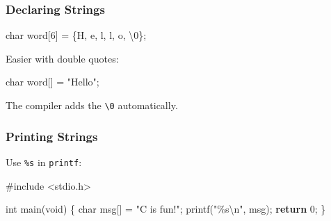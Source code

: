 \documentclass[
  letterpaper,
  DIV=11,
  numbers=noendperiod]{scrreprt}
\newenvironment{Shaded}{\begin{snugshade}}{\end{snugshade}}
\newcommand{\CharTok}[1]{\textcolor[rgb]{0.13,0.47,0.30}{#1}}
\newcommand{\ControlFlowTok}[1]{\textcolor[rgb]{0.00,0.23,0.31}{\textbf{#1}}}
\newcommand{\DataTypeTok}[1]{\textcolor[rgb]{0.68,0.00,0.00}{#1}}
\newcommand{\DecValTok}[1]{\textcolor[rgb]{0.68,0.00,0.00}{#1}}
\newcommand{\ImportTok}[1]{\textcolor[rgb]{0.00,0.46,0.62}{#1}}
\newcommand{\NormalTok}[1]{\textcolor[rgb]{0.00,0.23,0.31}{#1}}
\newcommand{\OperatorTok}[1]{\textcolor[rgb]{0.37,0.37,0.37}{#1}}
\newcommand{\PreprocessorTok}[1]{\textcolor[rgb]{0.68,0.00,0.00}{#1}}
\newcommand{\SpecialCharTok}[1]{\textcolor[rgb]{0.37,0.37,0.37}{#1}}
\newcommand{\StringTok}[1]{\textcolor[rgb]{0.13,0.47,0.30}{#1}}
\begin{document}
\subsubsection{Declaring Strings}\label{declaring-strings}

\begin{Shaded}
\begin{Highlighting}[]
\DataTypeTok{char}\NormalTok{ word}\OperatorTok{[}\DecValTok{6}\OperatorTok{]} \OperatorTok{=} \OperatorTok{\{}\CharTok{\textquotesingle{}H\textquotesingle{}}\OperatorTok{,} \CharTok{\textquotesingle{}e\textquotesingle{}}\OperatorTok{,} \CharTok{\textquotesingle{}l\textquotesingle{}}\OperatorTok{,} \CharTok{\textquotesingle{}l\textquotesingle{}}\OperatorTok{,} \CharTok{\textquotesingle{}o\textquotesingle{}}\OperatorTok{,} \CharTok{\textquotesingle{}}\SpecialCharTok{\textbackslash{}0}\CharTok{\textquotesingle{}}\OperatorTok{\};}
\end{Highlighting}
\end{Shaded}

Easier with double quotes:

\begin{Shaded}
\begin{Highlighting}[]
\DataTypeTok{char}\NormalTok{ word}\OperatorTok{[]} \OperatorTok{=} \StringTok{"Hello"}\OperatorTok{;}
\end{Highlighting}
\end{Shaded}

The compiler adds the
\texttt{\textquotesingle{}\textbackslash{}0\textquotesingle{}}
automatically.

\subsubsection{Printing Strings}\label{printing-strings}

Use \texttt{\%s} in \texttt{printf}:

\begin{Shaded}
\begin{Highlighting}[]
\PreprocessorTok{\#include }\ImportTok{\textless{}stdio.h\textgreater{}}

\DataTypeTok{int}\NormalTok{ main}\OperatorTok{(}\DataTypeTok{void}\OperatorTok{)} \OperatorTok{\{}
    \DataTypeTok{char}\NormalTok{ msg}\OperatorTok{[]} \OperatorTok{=} \StringTok{"C is fun!"}\OperatorTok{;}
\NormalTok{    printf}\OperatorTok{(}\StringTok{"}\SpecialCharTok{\%s\textbackslash{}n}\StringTok{"}\OperatorTok{,}\NormalTok{ msg}\OperatorTok{);}
    \ControlFlowTok{return} \DecValTok{0}\OperatorTok{;}
\OperatorTok{\}}
\end{Highlighting}
\end{Shaded}
\end{document}
